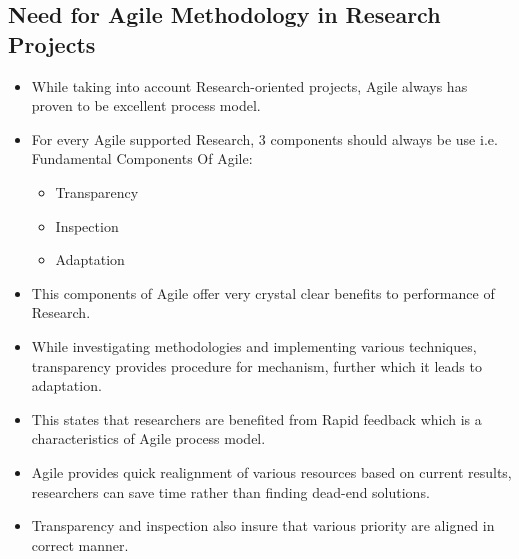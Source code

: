 \subsection{Need for Agile Methodology in Research Projects}
	\begin{itemize}
		\item While taking into account Research-oriented projects, Agile always has proven to be excellent process
		model.
		\item For every Agile supported Research, 3 components should always be use i.e. Fundamental
		Components Of Agile:
		\begin{itemize}
			\item Transparency
			\item Inspection
			\item Adaptation
		\end{itemize}
		\item This components of Agile offer very crystal clear benefits to performance of Research.
		\item While investigating methodologies and implementing various techniques, transparency
		provides procedure for mechanism, further which it leads to adaptation.
		\item This states that researchers are benefited from Rapid feedback which is a characteristics of
		Agile process model.
		\item Agile provides quick realignment of various resources based on current results, researchers
		can save time rather than finding dead-end solutions.
		\item Transparency and inspection also insure that various priority are aligned in correct manner.
	\end{itemize}


